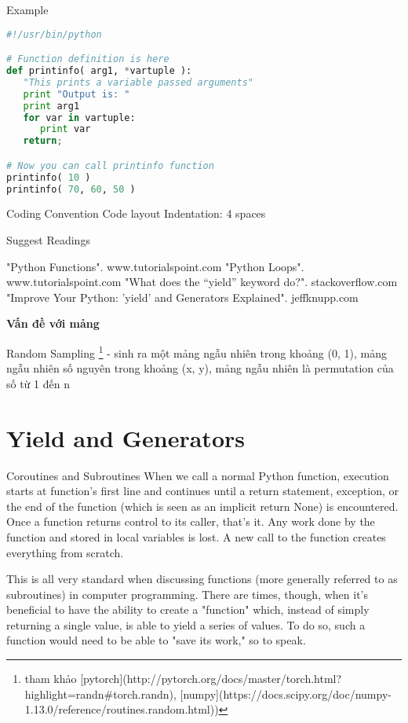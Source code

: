 Example

\begin{lstlisting}[language=Python]
#!/usr/bin/python

# Function definition is here
def printinfo( arg1, *vartuple ):
   "This prints a variable passed arguments"
   print "Output is: "
   print arg1
   for var in vartuple:
      print var
   return;

# Now you can call printinfo function
printinfo( 10 )
printinfo( 70, 60, 50 )
\end{lstlisting}

Coding Convention
Code layout
Indentation: 4 spaces

Suggest Readings

"Python Functions". www.tutorialspoint.com
"Python Loops". www.tutorialspoint.com
"What does the “yield” keyword do?". stackoverflow.com
"Improve Your Python: 'yield' and Generators Explained". jeffknupp.com

\textbf{Vấn đề với mảng}

\begin{item}
  \item Random Sampling \footnote{tham khảo [pytorch](http://pytorch.org/docs/master/torch.html?highlight=randn#torch.randn), [numpy](https://docs.scipy.org/doc/numpy-1.13.0/reference/routines.random.html))} - sinh ra một mảng ngẫu nhiên trong khoảng (0, 1), mảng ngẫu nhiên số nguyên trong khoảng (x, y), mảng ngẫu nhiên là permutation của số từ 1 đến n
\end{item}

\section{Yield and Generators}

Coroutines and Subroutines
When we call a normal Python function, execution starts at function's first line and continues until a return statement, exception, or the end of the function (which is seen as an implicit return None) is encountered. Once a function returns control to its caller, that's it. Any work done by the function and stored in local variables is lost. A new call to the function creates everything from scratch.

This is all very standard when discussing functions (more generally referred to as subroutines) in computer programming. There are times, though, when it's beneficial to have the ability to create a "function" which, instead of simply returning a single value, is able to yield a series of values. To do so, such a function would need to be able to "save its work," so to speak.

